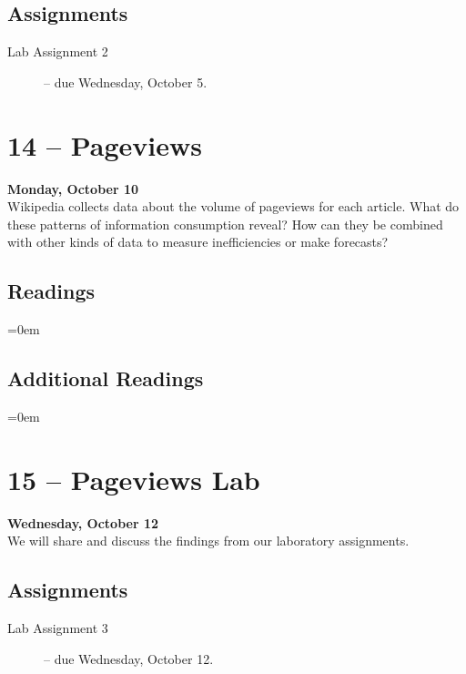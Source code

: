 \documentclass[11pt]{memoir}
\newenvironment{readinglist}{
\begin{list}{}{\leftmargin=8pt \itemindent=0em}
  \setlength{\itemsep}{8pt}
  \setlength{\parskip}{0em}
  \setlength{\parsep}{1em}
  \setlength{\parindent}{8em}}
{\end{list}}
\begin{document}
    \subsection{Assignments}
    \begin{description}%
        \item[Lab Assignment 2 ] -- due Wednesday, October 5. 
    \end{description}

\section{14 -- Pageviews}
\textcolor{CUGold}{\textbf{Monday, October 10}}\\
Wikipedia collects data about the volume of pageviews for each article. What do these patterns of information consumption reveal? How can they be combined with other kinds of data to measure inefficiencies or make forecasts?

    \subsection{Readings}
    \begin{readinglist}
        \item {}
        \item {}
    \end{readinglist}
    
    \subsection{Additional Readings}
    \begin{readinglist}
        \item {}
        \item {}
    \end{readinglist}

\section{15 -- Pageviews Lab}
\textcolor{CUGold}{\textbf{Wednesday, October 12}}\\
We will share and discuss the findings from our laboratory assignments.

    \subsection{Assignments}
    \begin{description}%
        \item[Lab Assignment 3 ] -- due Wednesday, October 12. 
    \end{description}
    
\end{document}
